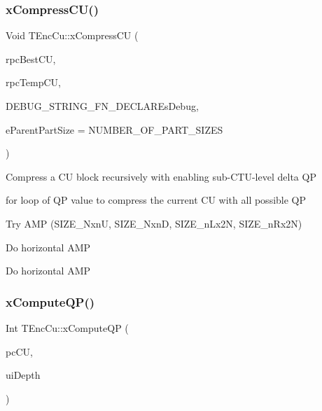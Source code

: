 \subsubsection{\texorpdfstring{x\+Compress\+C\+U()}{xCompressCU()}}
{\footnotesize\ttfamily Void T\+Enc\+Cu\+::x\+Compress\+CU (\begin{DoxyParamCaption}\item[{\hyperlink{class_t_com_data_c_u}{T\+Com\+Data\+CU} $\ast$\&}]{rpc\+Best\+CU,  }\item[{\hyperlink{class_t_com_data_c_u}{T\+Com\+Data\+CU} $\ast$\&}]{rpc\+Temp\+CU,  }\item[{const U\+Int ui\+Depth }]{D\+E\+B\+U\+G\+\_\+\+S\+T\+R\+I\+N\+G\+\_\+\+F\+N\+\_\+\+D\+E\+C\+L\+A\+REs\+Debug,  }\item[{\hyperlink{_type_def_8h_a0093b7809f3cfae06fda9d67441267bd}{Part\+Size}}]{e\+Parent\+Part\+Size = {\ttfamily NUMBER\+\_\+OF\+\_\+PART\+\_\+SIZES} }\end{DoxyParamCaption})\hspace{0.3cm}{\ttfamily [protected]}}

Compress a CU block recursively with enabling sub-\/\+C\+T\+U-\/level delta QP
\begin{DoxyItemize}
\item for loop of QP value to compress the current CU with all possible QP 
\end{DoxyItemize}Try A\+MP (S\+I\+Z\+E\+\_\+NxnU, S\+I\+Z\+E\+\_\+NxnD, S\+I\+Z\+E\+\_\+n\+Lx2N, S\+I\+Z\+E\+\_\+n\+Rx2N)

Do horizontal A\+MP

Do horizontal A\+MP \mbox{\label{class_t_enc_cu_ac3ce860dbe7ff14b78702e887f1586ce}} 
\subsubsection{\texorpdfstring{x\+Compute\+Q\+P()}{xComputeQP()}}
{\footnotesize\ttfamily Int T\+Enc\+Cu\+::x\+Compute\+QP (\begin{DoxyParamCaption}\item[{\hyperlink{class_t_com_data_c_u}{T\+Com\+Data\+CU} $\ast$}]{pc\+CU,  }\item[{U\+Int}]{ui\+Depth }\end{DoxyParamCaption})\hspace{0.3cm}{\ttfamily [protected]}}

